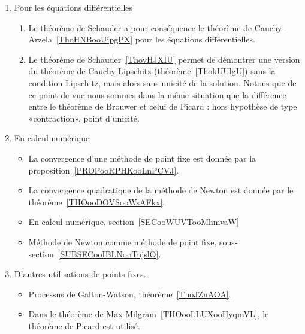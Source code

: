 \begin{enumerate}
\item Pour les équations différentielles
    \begin{enumerate}
        \item
            Le théorème de Schauder a pour conséquence le théorème de Cauchy-Arzela~\ref{ThoHNBooUipgPX} pour les équations différentielles.
        \item
            Le théorème de Schauder~\ref{ThovHJXIU} permet de démontrer une version du théorème de Cauchy-Lipschitz (théorème~\ref{ThokUUlgU}) sans la condition Lipschitz, mais alors sans unicité de la solution. Notons que de ce point de vue nous sommes dans la même situation que la différence entre le théorème de Brouwer et celui de Picard : hors hypothèse de type «contraction», point d'unicité.
    \end{enumerate}
\item
    En calcul numérique
    \begin{itemize}
        \item
            La convergence d'une méthode de point fixe est donnée par la proposition~\ref{PROPooRPHKooLnPCVJ}.
        \item
            La convergence quadratique de la méthode de Newton est donnée par le théorème~\ref{THOooDOVSooWsAFkx}.
        \item
            En calcul numérique, section~\ref{SECooWUVTooMhmvaW}
        \item
            Méthode de Newton comme méthode de point fixe, sous-section~\ref{SUBSECooIBLNooTujslO}.
    \end{itemize}

\item
    D'autres utilisations de points fixes.
\begin{itemize}
    \item
        Processus de Galton-Watson, théorème~\ref{ThoJZnAOA}.
    \item
        Dans le théorème de Max-Milgram~\ref{THOooLLUXooHyqmVL}, le théorème de Picard est utilisé.
\end{itemize}
\end{enumerate}



